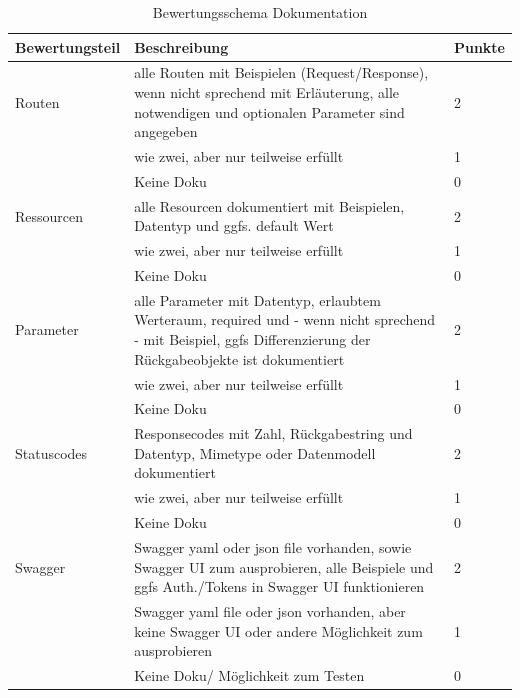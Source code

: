 \documentclass[notitlepage, hidelinks]{article}
\begin{document}
\begin{table}[H]
\begin{center}
\begin{tabular}{|p{3.6cm}|p{8.5cm}|p{2.5cm}|}
\hline
\textbf{Bewertungsteil} & \textbf{Beschreibung} & \textbf{Punkte}\\ \hline
Routen & alle Routen mit Beispielen (Request/Response), wenn nicht sprechend mit Erläuterung, alle notwendigen und optionalen Parameter sind angegeben & 2 \\ \hline
& wie zwei, aber nur teilweise erfüllt & 1 \\ \hline
& Keine Doku & 0 \\ \hline
Ressourcen & alle Resourcen dokumentiert mit Beispielen, Datentyp und ggfs. default Wert & 2 \\ \hline
& wie zwei, aber nur teilweise erfüllt & 1 \\ \hline
& Keine Doku & 0 \\ \hline
Parameter & alle Parameter mit Datentyp, erlaubtem Werteraum, required und - wenn nicht sprechend - mit Beispiel, ggfs Differenzierung der Rückgabeobjekte ist dokumentiert & 2 \\ \hline
& wie zwei, aber nur teilweise erfüllt & 1 \\ \hline
& Keine Doku & 0 \\ \hline
Statuscodes & Responsecodes mit Zahl, Rückgabestring und Datentyp, Mimetype oder Datenmodell dokumentiert & 2 \\ \hline
& wie zwei, aber nur teilweise erfüllt & 1 \\ \hline
& Keine Doku & 0 \\ \hline
Swagger & Swagger yaml oder json file vorhanden, sowie Swagger UI zum ausprobieren, alle Beispiele und ggfs Auth./Tokens in Swagger UI funktionieren & 2 \\ \hline
& Swagger yaml file oder json vorhanden, aber keine Swagger UI oder andere Möglichkeit zum ausprobieren & 1 \\ \hline
& Keine Doku/ Möglichkeit zum Testen & 0 \\ \hline
\end{tabular}
\caption{Bewertungsschema Dokumentation}
\label{documentation}
\end{center}
\end{table}
\end{document}
